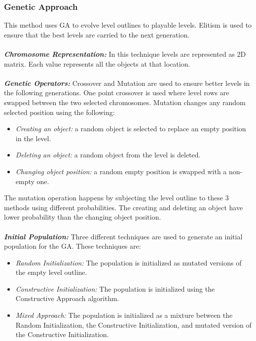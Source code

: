 \documentclass[letterpaper]{article}
\begin{document}
\subsubsection{Genetic Approach}
This method uses GA to evolve level outlines to playable levels. Elitism is used to ensure that the best levels are carried to the next generation.\\\\
\emph{\textbf{Chromosome Representation:}} In this technique levels are represented as 2D matrix. Each value represents all the objects at that location.\\\\
\emph{\textbf{Genetic Operators:}} Crossover and Mutation are used to ensure better levels in the following generations. One point crossover is used where level rows are swapped between the two selected chromosomes. Mutation changes any random selected position using the following:
\begin{itemize}
	\item \emph{Creating an object:} a random object is selected to replace an empty position in the level.
	\item \emph{Deleting an object:} a random object from the level is deleted.
	\item \emph{Changing object position:} a random empty position is swapped with a non-empty one.
\end{itemize}
The mutation operation happens by subjecting the level outline to these 3 methods using different probabilities. The creating and deleting an object have lower probability than the changing object position.\\\\
\emph{\textbf{Initial Population:}} Three different techniques are used to generate an initial population for the GA. These techniques are:
\begin{itemize}
	\item \emph{Random Initialization:} The population is initialized as mutated versions of the empty level outline.
	\item \emph{Constructive Initialization:} The population is initialized using the Constructive Approach algorithm.
	\item \emph{Mixed Approach:} The population is initialized as a mixture between the Random Initialization, the Constructive Initialization, and mutated version of the Constructive Initialization.
\end{itemize}
\end{document}
